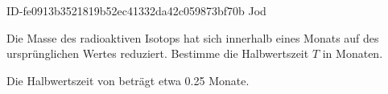 \begin{exercise}
      {ID-fe0913b3521819b52ec41332da42c059873bf70b}
      {Jod}
  \ifproblem\problem\par
    Die Masse des radioaktiven Isotops  hat sich innerhalb
    eines Monats auf  des ursprünglichen Wertes reduziert.
    Bestimme die Halbwertszeit $T$ in Monaten.
  \fi
  \ifoutcome\outcome\par
    Die Halbwertszeit von  beträgt etwa \num{0.25} Monate.
  \fi
\end{exercise}
